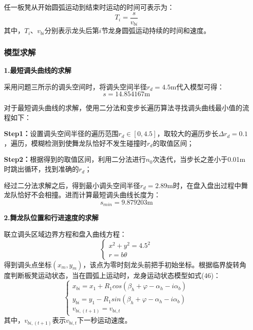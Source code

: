 \documentclass[withoutpreface,bwprint]{cumcmthesis} %
\begin{document}
	任一板凳从开始圆弧运动到结束时运动的时间可表示为：
	\begin{equation}
		T_i=\dfrac{s}{v_{bi}}
	\end{equation}
	其中，$T_i$、$v_{bi}$分别表示龙头后第$i$节龙身圆弧运动持续的时间和速度。
	\subsubsection{模型求解}
	\textbf{1.最短调头曲线的求解 }
	
	采用问题三所示的调头空间时，将调头空间半径$r_d=4.5$m代入模型可得：
	\begin{equation}
		s=14.854167\mbox{m}
	\end{equation}
	
	对于最短调头曲线的求解，使用二分法和变步长遍历算法寻找调头曲线最小值的流程如下：
	
	\textbf{Step1：}设置调头空间半径的遍历范围$r_d\in[0,4.5]$，取较大的遍历步长$\Delta  r_d=0.1$，遍历，模糊检测到使舞龙队恰好不发生碰撞时$r_d$的取值区间；
	
	\textbf{Step2：}根据得到的取值区间，利用二分法进行$n_0$次迭代，当步长之差小于0.01m时跳出循环，找到准确的$r_d$；
	
	经过二分法求解之后，得到最小调头空间半径$r_d=2.89$m时，在盘入盘出过程中舞龙队恰好不会相撞。进而计算最短调头曲线长度为：
	\begin{equation}
		s_{min}=9.879203\mbox{m}
	\end{equation}
	
	\textbf{2.舞龙队位置和行进速度的求解}
	
	联立调头区域边界方程和盘入曲线方程：
	\begin{equation}
		\begin{cases}
			x^2+y^2=4.5^2\\
			r=b\theta
		\end{cases}
	\end{equation}
	得到调头点坐标$(x_m,y_m)$，该点为零时刻龙头前把手初始坐标。根据临界旋转角度判断板凳运动状态，当在圆弧上运动时，龙身运动状态模型如式(46)：
	\begin{equation}
		\begin{cases}
			x_{bi}=x_1+R_1cos(\beta_h+\varphi-\alpha_h-i\alpha_b)\\
			y_{bi}=y_1-R_1sin(\beta_h+\varphi-\alpha_h-i\alpha_b)\\
			v_{bi,(t+1)}=v_{bi,t}
		\end{cases}
	\end{equation}
	其中，$v_{bi,(t+1)}$表示$v_{bi,t}$下一秒运动速度。
	
\end{document}
